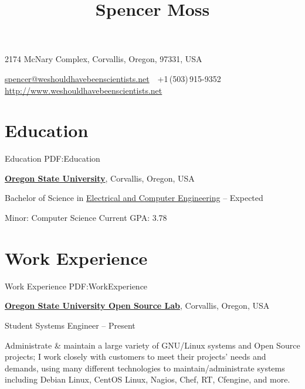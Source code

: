 \documentclass[letterpaper,MMMyyyy,nonstop]{simpleresumecv}
\newcommand{\CVAuthor}{Spencer Moss}
\newcommand{\CVWebpage}{http://www.weshouldhavebeenscientists.net}
\begin{document}

\title{\CVAuthor}

\begin{subtitle}
2174 McNary Complex, Corvallis, Oregon, 97331, USA
\par
\href{mailto:spencer@weshouldhavebeenscientists.net}
{spencer@weshouldhavebeenscientists.net}
\,\SubBulletSymbol\,
+1\,(503)\,915-9352
\,\SubBulletSymbol\,
\href{\CVWebpage}
{\CVWebpage}
\end{subtitle}

\begin{body}


\section
{Education}
{Education}
{PDF:Education}

\href{http://www.oregonstate.edu/}
{\textbf{Oregon State University}},
Corvallis, Oregon, USA

\GapNoBreak
\BulletItem
Bachelor of Science in
\href{http://www.eecs.oregonstate.edu/}
{Electrical and Computer Engineering}
\hfill
{} -- Expected 
\begin{detail}
\SubBulletItem
Minor: Computer Science
\SubBulletItem
Current GPA: 3.78
\iffalse
\SubBulletItem
Current Projected Interest Areas:
Computer Architecture \& Networks, VLSI, Lasers \& Sensors
\fi
\end{detail}


\section
{Work\newline
Experience}
{Work Experience}
{PDF:WorkExperience}

\href{http://www.osuosl.org}
{\textbf{Oregon State University Open Source Lab}},
Corvallis, Oregon, USA

\GapNoBreak
\BulletItem
Student Systems Engineer
\hfill
{} --
Present
\begin{detail}
\SubBulletItem
Administrate \& maintain a large variety of GNU/Linux systems and Open Source projects; I work closely with customers to meet their projects' needs and demands, using many different technologies to maintain/administrate systems including Debian Linux, CentOS Linux, Nagios, Chef, RT, Cfengine, and more.
\end{detail}


\end{body}
\end{document}
